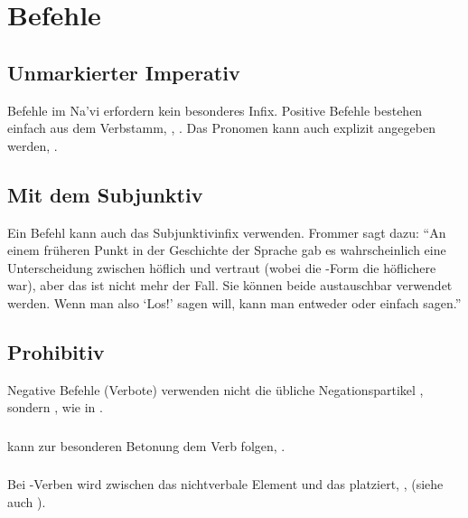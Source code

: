 \section{Befehle}
\subsection{Unmarkierter Imperativ} Befehle im Na'vi erfordern kein besonderes Infix. Positive Befehle bestehen einfach aus dem Verbstamm,  ,  . Das Pronomen kann auch explizit angegeben werden,  .

\subsection{Mit dem Subjunktiv} Ein Befehl kann auch das Subjunktivinfix  verwenden. Frommer sagt dazu: ``An einem früheren Punkt in der Geschichte der Sprache gab es wahrscheinlich eine Unterscheidung zwischen höflich und vertraut (wobei die -Form die höflichere war), aber das ist nicht mehr der Fall. Sie können beide austauschbar verwendet werden. Wenn man also `Los!' sagen will, kann man entweder  oder einfach  sagen.''


\subsection{Prohibitiv} Negative Befehle (Verbote) verwenden nicht die übliche Negationspartikel , sondern , wie in  .
\label{syntax:prohibitions}

\subsubsection{}  kann zur besonderen Betonung dem Verb folgen,  .

\subsubsection{} Bei -Verben wird  zwischen das nichtverbale Element und das  platziert,  ,   (siehe auch ).


